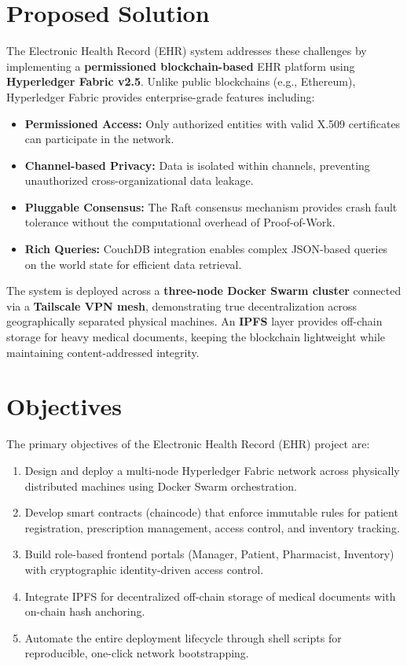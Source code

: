 \section{Proposed Solution}

The Electronic Health Record (EHR) system addresses these challenges by implementing a \textbf{permissioned blockchain-based} EHR platform using \textbf{Hyperledger Fabric v2.5}. Unlike public blockchains (e.g., Ethereum), Hyperledger Fabric provides enterprise-grade features including:

\begin{itemize}
    \item \textbf{Permissioned Access:} Only authorized entities with valid X.509 certificates can participate in the network.
    \item \textbf{Channel-based Privacy:} Data is isolated within channels, preventing unauthorized cross-organizational data leakage.
    \item \textbf{Pluggable Consensus:} The Raft consensus mechanism provides crash fault tolerance without the computational overhead of Proof-of-Work.
    \item \textbf{Rich Queries:} CouchDB integration enables complex JSON-based queries on the world state for efficient data retrieval.
\end{itemize}

The system is deployed across a \textbf{three-node Docker Swarm cluster} connected via a \textbf{Tailscale VPN mesh}, demonstrating true decentralization across geographically separated physical machines. An \textbf{IPFS} layer provides off-chain storage for heavy medical documents, keeping the blockchain lightweight while maintaining content-addressed integrity.

\section{Objectives}

The primary objectives of the Electronic Health Record (EHR) project are:

\begin{enumerate}
    \item Design and deploy a multi-node Hyperledger Fabric network across physically distributed machines using Docker Swarm orchestration.
    \item Develop smart contracts (chaincode) that enforce immutable rules for patient registration, prescription management, access control, and inventory tracking.
    \item Build role-based frontend portals (Manager, Patient, Pharmacist, Inventory) with cryptographic identity-driven access control.
    \item Integrate IPFS for decentralized off-chain storage of medical documents with on-chain hash anchoring.
    \item Automate the entire deployment lifecycle through shell scripts for reproducible, one-click network bootstrapping.
\end{enumerate}

